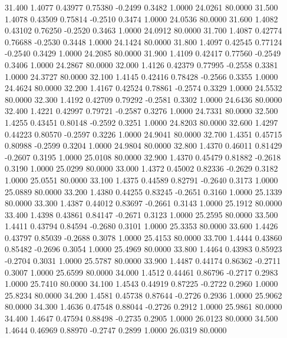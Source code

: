   31.400   1.4077   0.43977   0.75380  -0.2499   0.3482   1.0000  24.0261  80.0000
  31.500   1.4078   0.43509   0.75814  -0.2510   0.3474   1.0000  24.0536  80.0000
  31.600   1.4082   0.43102   0.76250  -0.2520   0.3463   1.0000  24.0912  80.0000
  31.700   1.4087   0.42774   0.76688  -0.2530   0.3448   1.0000  24.1424  80.0000
  31.800   1.4097   0.42545   0.77124  -0.2540   0.3429   1.0000  24.2085  80.0000
  31.900   1.4109   0.42417   0.77560  -0.2549   0.3406   1.0000  24.2867  80.0000
  32.000   1.4126   0.42379   0.77995  -0.2558   0.3381   1.0000  24.3727  80.0000
  32.100   1.4145   0.42416   0.78428  -0.2566   0.3355   1.0000  24.4624  80.0000
  32.200   1.4167   0.42524   0.78861  -0.2574   0.3329   1.0000  24.5532  80.0000
  32.300   1.4192   0.42709   0.79292  -0.2581   0.3302   1.0000  24.6436  80.0000
  32.400   1.4221   0.42997   0.79721  -0.2587   0.3276   1.0000  24.7331  80.0000
  32.500   1.4255   0.43451   0.80148  -0.2592   0.3251   1.0000  24.8203  80.0000
  32.600   1.4297   0.44223   0.80570  -0.2597   0.3226   1.0000  24.9041  80.0000
  32.700   1.4351   0.45715   0.80988  -0.2599   0.3204   1.0000  24.9804  80.0000
  32.800   1.4370   0.46011   0.81429  -0.2607   0.3195   1.0000  25.0108  80.0000
  32.900   1.4370   0.45479   0.81882  -0.2618   0.3190   1.0000  25.0299  80.0000
  33.000   1.4372   0.45002   0.82336  -0.2629   0.3182   1.0000  25.0551  80.0000
  33.100   1.4375   0.44589   0.82791  -0.2640   0.3173   1.0000  25.0889  80.0000
  33.200   1.4380   0.44255   0.83245  -0.2651   0.3160   1.0000  25.1339  80.0000
  33.300   1.4387   0.44012   0.83697  -0.2661   0.3143   1.0000  25.1912  80.0000
  33.400   1.4398   0.43861   0.84147  -0.2671   0.3123   1.0000  25.2595  80.0000
  33.500   1.4411   0.43794   0.84594  -0.2680   0.3101   1.0000  25.3353  80.0000
  33.600   1.4426   0.43797   0.85039  -0.2688   0.3078   1.0000  25.4153  80.0000
  33.700   1.4444   0.43860   0.85482  -0.2696   0.3054   1.0000  25.4969  80.0000
  33.800   1.4464   0.43983   0.85923  -0.2704   0.3031   1.0000  25.5787  80.0000
  33.900   1.4487   0.44174   0.86362  -0.2711   0.3007   1.0000  25.6599  80.0000
  34.000   1.4512   0.44461   0.86796  -0.2717   0.2983   1.0000  25.7410  80.0000
  34.100   1.4543   0.44919   0.87225  -0.2722   0.2960   1.0000  25.8234  80.0000
  34.200   1.4581   0.45738   0.87644  -0.2726   0.2936   1.0000  25.9062  80.0000
  34.300   1.4636   0.47548   0.88044  -0.2726   0.2912   1.0000  25.9861  80.0000
  34.400   1.4647   0.47594   0.88498  -0.2735   0.2905   1.0000  26.0123  80.0000
  34.500   1.4644   0.46969   0.88970  -0.2747   0.2899   1.0000  26.0319  80.0000
